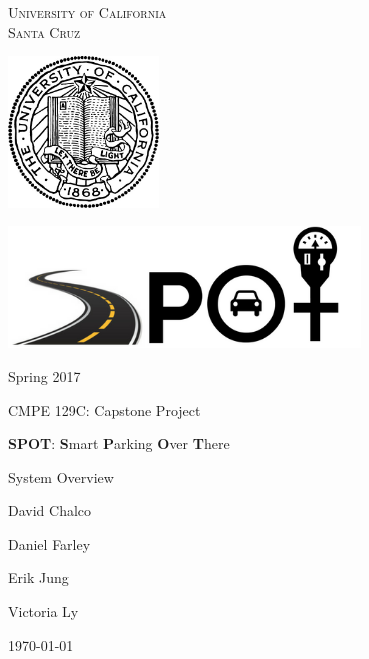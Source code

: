 \documentclass[12pt,a4paper]{article}
\begin{document}
\begin{titlepage}
	\centering
	{\scshape\huge University of California \\ Santa Cruz \par}
	\vspace{1cm}
	\includegraphics[width=0.3\textwidth]{pictures/uc_seal.jpg}\par\vspace{2cm}
	\vfill
	\vspace{-2cm}
	\includegraphics[width=0.7\textwidth]{pictures/spot.png}\par\vspace{2cm}
	{\huge Spring 2017\par}
	\vspace{1 cm}
	{\huge CMPE 129C: Capstone Project\par}
	{\huge \textbf{SPOT}: \textbf{S}mart \textbf{P}arking \textbf{O}ver \textbf{T}here\par}	
	{\huge System Overview\par}
	\par
	\vfill

	{\large David Chalco\par}
	{\large Daniel Farley\par}
	{\large Erik Jung\par}
	{\large Victoria Ly\par}
	{\large \today\par}
\end{titlepage}

\tableofcontents
\newpage

\setcounter{section}{0}
\captionsetup{labelfont=bf}

\end{document}
